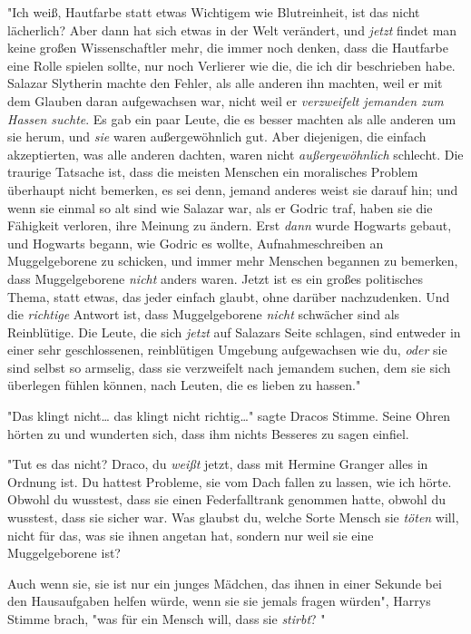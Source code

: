 {"Ich weiß, Hautfarbe statt etwas Wichtigem wie Blutreinheit, ist das nicht lächerlich? Aber dann hat sich etwas in der Welt verändert, und \emph{jetzt} findet man keine großen Wissenschaftler mehr, die immer noch denken, dass die Hautfarbe eine Rolle spielen sollte, nur noch Verlierer wie die, die ich dir beschrieben habe. Salazar Slytherin machte den Fehler, als alle anderen ihn machten, weil er mit dem Glauben daran aufgewachsen war, nicht weil er \emph{verzweifelt jemanden zum Hassen suchte}. Es gab ein paar Leute, die es besser machten als alle anderen um sie herum, und \emph{sie} waren außergewöhnlich gut. Aber diejenigen, die einfach akzeptierten, was alle anderen dachten, waren nicht \emph{außergewöhnlich} schlecht. Die traurige Tatsache ist, dass die meisten Menschen ein moralisches Problem überhaupt nicht bemerken, es sei denn, jemand anderes weist sie darauf hin; und wenn sie einmal so alt sind wie Salazar war, als er Godric traf, haben sie die Fähigkeit verloren, ihre Meinung zu ändern. Erst \emph{dann} wurde Hogwarts gebaut, und Hogwarts begann, wie Godric es wollte, Aufnahmeschreiben an Muggelgeborene zu schicken, und immer mehr Menschen begannen zu bemerken, dass Muggelgeborene \emph{nicht} anders waren. Jetzt ist es ein großes politisches Thema, statt etwas, das jeder einfach glaubt, ohne darüber nachzudenken. Und die \emph{richtige} Antwort ist, dass Muggelgeborene \emph{nicht} schwächer sind als Reinblütige. Die Leute, die sich \emph{jetzt} auf Salazars Seite schlagen, sind entweder in einer sehr geschlossenen, reinblütigen Umgebung aufgewachsen wie du, \emph{oder} sie sind selbst so armselig, dass sie verzweifelt nach jemandem suchen, dem sie sich überlegen fühlen können, nach Leuten, die es lieben zu hassen."

"Das klingt nicht… das klingt nicht richtig…" sagte Dracos Stimme. Seine Ohren hörten zu und wunderten sich, dass ihm nichts Besseres zu sagen einfiel.

"Tut es das nicht? Draco, du \emph{weißt} jetzt, dass mit Hermine Granger alles in Ordnung ist. Du hattest Probleme, sie vom Dach fallen zu lassen, wie ich hörte. Obwohl du wusstest, dass sie einen Federfalltrank genommen hatte, obwohl du wusstest, dass sie sicher war. Was glaubst du, welche Sorte Mensch sie \emph{töten} will, nicht für das, was sie ihnen angetan hat, sondern nur weil sie eine Muggelgeborene ist?

Auch wenn sie, sie ist nur ein junges Mädchen, das ihnen in einer Sekunde bei den Hausaufgaben helfen würde, wenn sie sie jemals fragen würden", Harrys Stimme brach, "was für ein Mensch will, dass sie \emph{stirbt}? "

}
